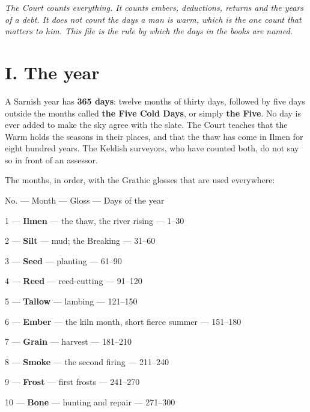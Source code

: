 \documentclass{design/chronicle}
\begin{document}
\emph{The Court counts everything. It counts embers, deductions, returns and the years of a debt. It does not count the days a man is warm, which is the one count that matters to him. This file is the rule by which the days in the books are named.}

\CRrule

\section*{I. The year}

A Sarnish year has \textbf{365 days}: twelve months of thirty days, followed by five days outside the months called \textbf{the Five Cold Days}, or simply \textbf{the Five}. No day is ever added to make the sky agree with the slate. The Court teaches that the Warm holds the seasons in their places, and that the thaw has come in Ilmen for eight hundred years. The Keldish surveyors, who have counted both, do not say so in front of an assessor.

The months, in order, with the Grathic glosses that are used everywhere:

No. — Month — Gloss — Days of the year\par

1 — \textbf{Ilmen} — the thaw, the river rising — 1–30\par

2 — \textbf{Silt} — mud; the Breaking — 31–60\par

3 — \textbf{Seed} — planting — 61–90\par

4 — \textbf{Reed} — reed-cutting — 91–120\par

5 — \textbf{Tallow} — lambing — 121–150\par

6 — \textbf{Ember} — the kiln month, short fierce summer — 151–180\par

7 — \textbf{Grain} — harvest — 181–210\par

8 — \textbf{Smoke} — the second firing — 211–240\par

9 — \textbf{Frost} — first frosts — 241–270\par

10 — \textbf{Bone} — hunting and repair — 271–300\par
\end{document}
